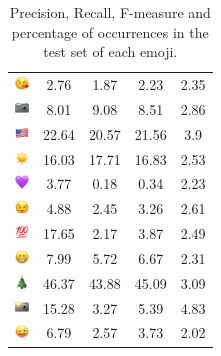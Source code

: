 \documentclass{article}
\begin{document}
\begin{table}
\begin{tabular}{|c|ccc|c|}
\includegraphics[height=0.37cm,width=0.37cm]{img/face_blowing_a_kiss.png} & 2.76 & 1.87 & 2.23 & 2.35\\ 
\includegraphics[height=0.37cm,width=0.37cm]{img/camera.png} & 8.01 & 9.08 & 8.51 & 2.86\\ 
\includegraphics[height=0.37cm,width=0.37cm]{img/United_States.png} & 22.64 & 20.57 & 21.56 & 3.9\\ 
\includegraphics[height=0.37cm,width=0.37cm]{img/sun.png} & 16.03 & 17.71 & 16.83 & 2.53\\ 
\includegraphics[height=0.37cm,width=0.37cm]{img/purple_heart.png} & 3.77 & 0.18 & 0.34 & 2.23\\ 
\includegraphics[height=0.37cm,width=0.37cm]{img/winking_face.png} & 4.88 & 2.45 & 3.26 & 2.61\\ 
\includegraphics[height=0.37cm,width=0.37cm]{img/hundred_points.png} & 17.65 & 2.17 & 3.87 & 2.49\\ 
\includegraphics[height=0.37cm,width=0.37cm]{img/beaming_face_with_smiling_eyes.png} & 7.99 & 5.72 & 6.67 & 2.31\\ 
\includegraphics[height=0.37cm,width=0.37cm]{img/Christmas_tree.png} & 46.37 & 43.88 & 45.09 & 3.09\\ 
\includegraphics[height=0.37cm,width=0.37cm]{img/camera_with_flash.png} & 15.28 & 3.27 & 5.39 & 4.83\\ 
\includegraphics[height=0.37cm,width=0.37cm]{img/winking_face_with_tongue.png} & 6.79 & 2.57 & 3.73 & 2.02\\ 

\hline
\end{tabular}
\caption{\label{table:emoji_detailed} Precision, Recall, F-measure and percentage of occurrences in the test set of each emoji.}
\end{table}
\end{document}
